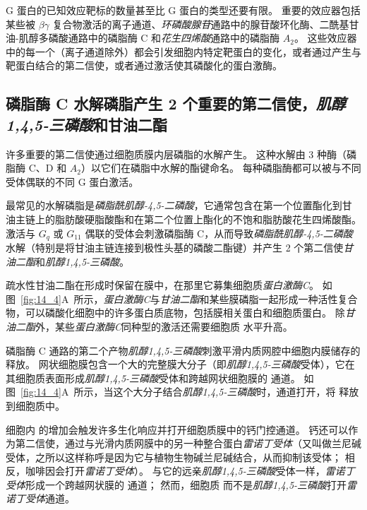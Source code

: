 G 蛋白的已知效应靶标的数量甚至比 G 蛋白的类型还要有限。
重要的效应器包括某些被 $\beta \gamma$ 复合物激活的离子通道、\textit{环磷酸腺苷}通路中的腺苷酸环化酶、二酰基甘油-肌醇多磷酸通路中的磷脂酶 C 和\textit{花生四烯酸}通路中的磷脂酶 $A_2$。
这些效应器中的每一个（离子通道除外）都会引发细胞内特定靶蛋白的变化，或者通过产生与靶蛋白结合的第二信使，或者通过激活使其磷酸化的蛋白激酶。



\subsection{磷脂酶 C 水解磷脂产生 2 个重要的第二信使，\textit{肌醇1,4,5-三磷酸}和甘油二酯}

许多重要的第二信使通过细胞质膜内层磷脂的水解产生。
这种水解由 3 种酶（磷脂酶 C、D 和 $A_2$）以它们在磷脂中水解的酯键命名。
每种磷脂酶都可以被与不同受体偶联的不同 G 蛋白激活。


最常见的水解磷脂是\textit{磷脂酰肌醇-4,5-二磷酸}，它通常包含在第一个位置酯化到甘油主链上的脂肪酸硬脂酸酯和在第二个位置上酯化的不饱和脂肪酸花生四烯酸酯。
激活与 $ G_q $ 或 $ G_{11} $ 偶联的受体会刺激磷脂酶 C，从而导致\textit{磷脂酰肌醇-4,5-二磷酸}水解（特别是将甘油主链连接到极性头基的磷酸二酯键）并产生 2 个第二信使\textit{甘油二酯}和\textit{肌醇1,4,5-三磷酸}。


疏水性甘油二酯在形成时保留在膜中，在那里它募集细胞质\textit{蛋白激酶C}。
如图~\ref{fig:14_4}A~所示，\textit{蛋白激酶C}与\textit{甘油二酯}和某些膜磷脂一起形成一种活性复合物，可以磷酸化细胞中的许多蛋白质底物，包括膜相关蛋白和细胞质蛋白。
除\textit{甘油二酯}外，某些\textit{蛋白激酶C}同种型的激活还需要细胞质  水平升高。


磷脂酶 C 通路的第二个产物\textit{肌醇1,4,5-三磷酸}刺激平滑内质网腔中细胞内膜储存的  释放。
网状细胞膜包含一个大的完整膜大分子（即\textit{肌醇1,4,5-三磷酸}受体），它在其细胞质表面形成\textit{肌醇1,4,5-三磷酸}受体和跨越网状细胞膜的  通道。
如图~\ref{fig:14_4}A~所示，当这个大分子结合\textit{肌醇1,4,5-三磷酸}时，通道打开，将  释放到细胞质中。


细胞内  的增加会触发许多生化响应并打开细胞质膜中的钙门控通道。
钙还可以作为第二信使，通过与光滑内质网膜中的另一种整合蛋白\textit{雷诺丁受体}（又叫做兰尼碱受体，之所以这样称呼是因为它与植物生物碱兰尼碱结合，从而抑制该受体；
相反，咖啡因会打开\textit{雷诺丁受体}）。
与它的远亲\textit{肌醇1,4,5-三磷酸}受体一样，\textit{雷诺丁受体}形成一个跨越网状膜的  通道；
然而，细胞质  而不是\textit{肌醇1,4,5-三磷酸}打开\textit{雷诺丁受体}通道。


